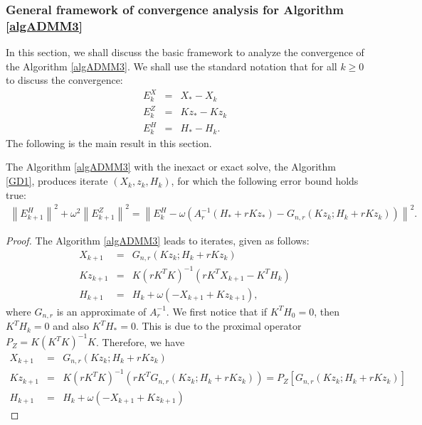\begin{itemize}
\subsubsection{General framework of convergence analysis for Algorithm \ref{algADMM3}}

In this section, we shall discuss the basic framework to analyze the convergence of the Algorithm \ref{algADMM3}. We shall use the standard notation that for all $k \geq 0$ to discuss the convergence:  
\begin{eqnarray*}
E_k^X &=& X_* - X_k \\
E_k^Z &=& Kz_* - Kz_k \\ 
E_k^H &=& H_* - H_k. 
\end{eqnarray*}
The following is the main result in this section. 
\begin{theorem}\label{main:theorem0} 
The Algorithm \ref{algADMM3} with the inexact or exact solve, the Algorithm \ref{GD1}, produces iterate $(X_k, z_k, H_k)$, for which the following error bound holds true: 
\begin{eqnarray*}
\left \|E_{k+1}^H \right \|^2 + \omega^2 \left \|E_{k+1}^Z \right \|^2 = \left \|E_k^H - \omega (A_r^{-1} (H_* + r K z_*) - G_{n,r} (Kz_k; H_k + r K z_k)) \right \|^2. 
\end{eqnarray*}
\end{theorem}
\begin{proof} 
The Algorithm \ref{algADMM3} leads to iterates, given as follows: 
\begin{eqnarray*}
X_{k+1} &=& G_{n,r} (Kz_k;H_k + r K z_k) \\
Kz_{k+1} &=& K(rK^TK)^{-1} (rK^T X_{k+1} - K^TH_k) \\ 
H_{k+1} &=& H_k + \omega (-X_{k+1} + Kz_{k+1} ), 
\end{eqnarray*}
where $G_{n,r}$ is an approximate of $A_r^{-1}$. We first notice that if $K^TH_0 = 0$, then $K^TH_k = 0$ and also $K^TH_* = 0$. This is due to the proximal operator $P_Z = K(K^TK)^{-1}K$. Therefore, we have 
\begin{eqnarray*}
X_{k+1} &=& G_{n,r} (Kz_k; H_k + r K z_k) \\
Kz_{k+1} &=& K(rK^TK)^{-1} (rK^T G_{n,r} (Kz_k;H_k + r K z_k)) = P_Z [G_{n,r} (Kz_k; H_k + r K z_k)]  \\ 
H_{k+1} &=& H_k + \omega (-X_{k+1} + Kz_{k+1} )
\end{eqnarray*}

\end{proof}
\end{itemize}
